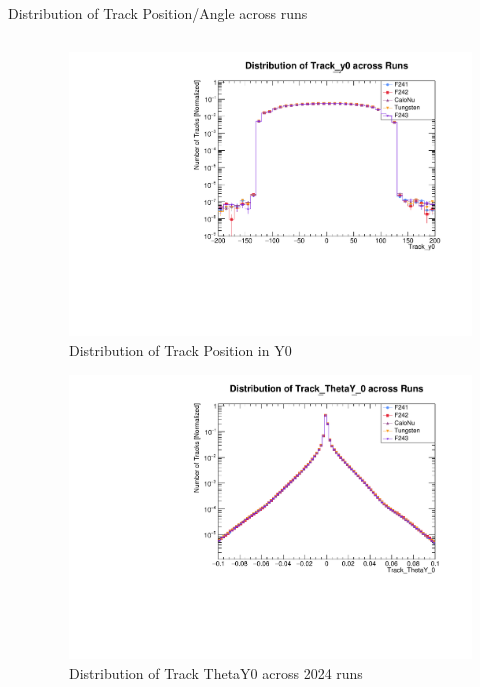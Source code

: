 \begin{frame}{Distribution of Track Position/Angle across runs}
\begin{columns}
\begin{column}{0.5\linewidth}
		\end{column}
		\begin{column}{0.5 \linewidth}
			\vspace{-0.4cm}
			\begin{figure}
				\includegraphics[width=\linewidth]{./RunwisePlots/Track_y0_runwise.pdf}
				\caption{Distribution of Track Position in Y0}
			\end{figure}
			\vspace{-0.9cm}
			\begin{figure}
				\includegraphics[width=\linewidth]{./RunwisePlots/Track_ThetaY_0_runwise.pdf}
				\caption{Distribution of Track ThetaY0 across 2024 runs}
			\end{figure}
		\end{column}
	\end{columns}
\end{frame}


